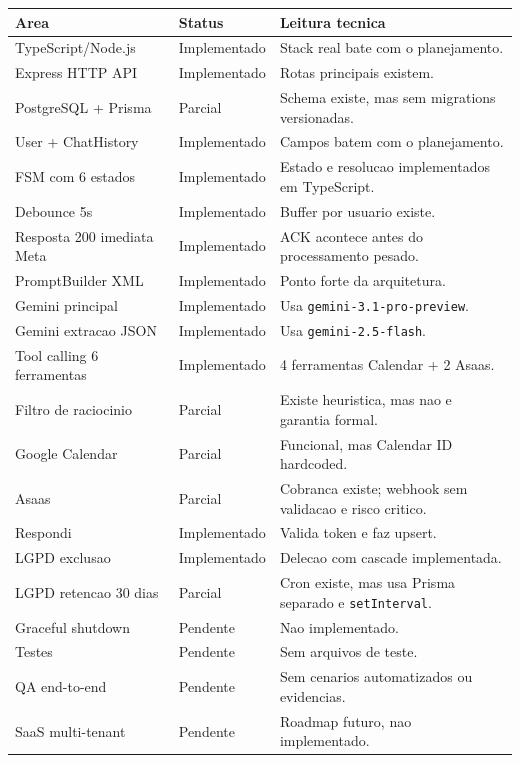 \documentclass[11pt,a4paper]{article}
\newcommand{\statusok}{\textcolor{artemisGreen}{Implementado}}
\newcommand{\statuspartial}{\textcolor{artemisGold}{Parcial}}
\newcommand{\statusmissing}{\textcolor{artemisRed}{Pendente}}
\begin{document}
\begin{longtable}{p{}p{}p{}}
\toprule
\textbf{Area} & \textbf{Status} & \textbf{Leitura tecnica} \\
\midrule
TypeScript/Node.js & \statusok & Stack real bate com o planejamento. \\
Express HTTP API & \statusok & Rotas principais existem. \\
PostgreSQL + Prisma & \statuspartial & Schema existe, mas sem migrations versionadas. \\
User + ChatHistory & \statusok & Campos batem com o planejamento. \\
FSM com 6 estados & \statusok & Estado e resolucao implementados em TypeScript. \\
Debounce 5s & \statusok & Buffer por usuario existe. \\
Resposta 200 imediata Meta & \statusok & ACK acontece antes do processamento pesado. \\
PromptBuilder XML & \statusok & Ponto forte da arquitetura. \\
Gemini principal & \statusok & Usa \texttt{gemini-3.1-pro-preview}. \\
Gemini extracao JSON & \statusok & Usa \texttt{gemini-2.5-flash}. \\
Tool calling 6 ferramentas & \statusok & 4 ferramentas Calendar + 2 Asaas. \\
Filtro de raciocinio & \statuspartial & Existe heuristica, mas nao e garantia formal. \\
Google Calendar & \statuspartial & Funcional, mas Calendar ID hardcoded. \\
Asaas & \statuspartial & Cobranca existe; webhook sem validacao e risco critico. \\
Respondi & \statusok & Valida token e faz upsert. \\
LGPD exclusao & \statusok & Delecao com cascade implementada. \\
LGPD retencao 30 dias & \statuspartial & Cron existe, mas usa Prisma separado e \texttt{setInterval}. \\
Graceful shutdown & \statusmissing & Nao implementado. \\
Testes & \statusmissing & Sem arquivos de teste. \\
QA end-to-end & \statusmissing & Sem cenarios automatizados ou evidencias. \\
SaaS multi-tenant & \statusmissing & Roadmap futuro, nao implementado. \\
\bottomrule
\end{longtable}
\end{document}
